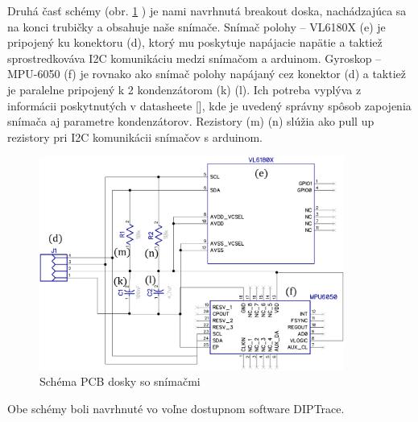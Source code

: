 Druhá časť schémy (obr. \ref{OBRAZOK 2.1.2} ) je nami navrhnutá breakout doska, nachádzajúca sa na konci trubičky a obsahuje naše snímače. Snímač polohy – VL6180X (e) je pripojený ku konektoru (d), ktorý mu poskytuje napájacie napätie a taktiež sprostredkováva I2C komunikáciu medzi snímačom a arduinom. Gyroskop – MPU-6050 (f) je rovnako ako snímač polohy napájaný cez konektor (d) a taktiež je paralelne pripojený k 2 kondenzátorom (k) (l). Ich potreba vyplýva z informácii poskytnutých v datasheete [], kde je uvedený správny spôsob zapojenia snímača aj parametre kondenzátorov. Rezistory (m) (n) slúžia ako pull up rezistory pri I2C komunikácii snímačov s arduinom. 
\begin{figure}[]
	\centering
	\includegraphics[width=100mm]{obr/senzors.eps}
	\caption{Schéma PCB dosky so snímačmi}\label{OBRAZOK 2.1.2} 
\end{figure} 

Obe schémy boli navrhnuté vo voľne dostupnom software DIPTrace. 

